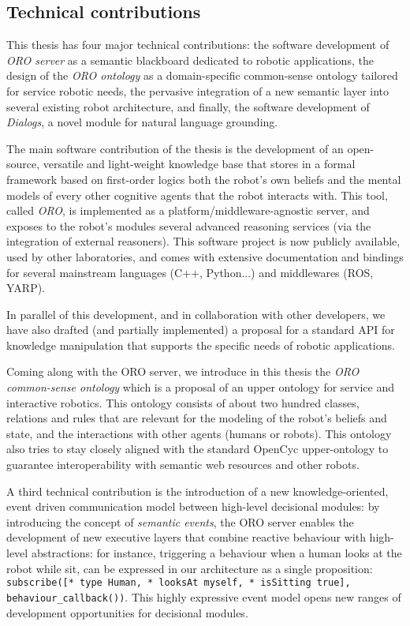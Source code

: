 \subsection{Technical contributions}
\label{sect|technical-contributions}


This thesis has four major technical contributions: the software development of
\emph{ORO server} as a semantic blackboard dedicated to robotic applications,
the design of the \emph{ORO ontology} as a domain-specific common-sense
ontology tailored for service robotic needs, the pervasive integration of a new
semantic layer into several existing robot architecture, and finally, the
software development of \emph{Dialogs}, a novel module for natural language
grounding.

The main software contribution of the thesis is the development of an
open-source, versatile and light-weight knowledge base that stores in a
formal framework based on first-order logics both the robot's own beliefs and
the mental models of every other cognitive agents that the robot interacts
with. This tool, called \emph{ORO}, is implemented as a
platform/middleware-agnostic server, and exposes to the robot's modules
several advanced reasoning services (via the integration of external
reasoners). This software project is now publicly available, used by other
laboratories, and comes with extensive documentation and bindings for several
mainstream languages (C++, Python...) and middlewares (ROS, YARP).

In parallel of this development, and in collaboration with other developers,
we have also drafted (and partially implemented) a proposal for a standard API
for knowledge manipulation that supports the specific needs of robotic
applications.

Coming along with the ORO server, we introduce in this thesis the
\emph{ORO common-sense ontology} which is a proposal of an upper ontology for
service and interactive robotics. This ontology consists of about two hundred
classes, relations and rules that are relevant for the modeling of the
robot's beliefs and state, and the interactions with other agents (humans or
robots). This ontology also tries to stay closely aligned with the standard
{\sc OpenCyc} upper-ontology to guarantee interoperability with semantic
web resources and other robots.

A third technical contribution is the introduction of a new
knowledge-oriented, event driven communication model between high-level
decisional modules: by introducing the concept of \emph{semantic events}, the ORO
server enables the development of new executive layers that combine reactive
behaviour with high-level abstractions: for instance, triggering a behaviour
when a human looks at the robot while sit, can be expressed in our architecture
as a single proposition: {\tt subscribe([* type Human, * looksAt myself, *
isSitting true], behaviour\_callback())}. This highly expressive event model
opens new ranges of development opportunities for decisional modules.

